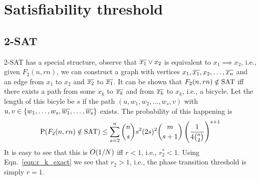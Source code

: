 \documentclass[letterpaper, 10pt, twocolumn, reqno, fleqn]{amsart}
\begin{document}
\section{Satisfiability threshold}
\label{sec:sat_thresh}


\subsection{2-SAT}
\label{ssec:2sat}
2-SAT has a special structure, observe that $\overline{x_1} \vee x_2$ is equivalent to $x_1 \implies x_2$, i.e., given $F_2(n, rn)$, we can construct a graph with
vertices $x_1, \overline{x_1}, x_2, \ldots, \overline{x_n}$ and an edge from $x_1$ to $x_2$ and $\overline{x_2}$ to $\overline{x_1}$. It can be shown that $F_2(n,rn) \notin \textrm{SAT}$ iff
there exists a path from some $x_k$ to $\overline{x_k}$ and from $\overline{x_k}$ to $x_k$, i.e., a bicycle. Let the length of this bicyle be $s$ if the path $(u, w_1, w_2
, \ldots, w_s, v)$ with $u,v \in \{w_1, \ldots, w_s,\overline{w_1}, \ldots, \overline{w_s}\}$
 exists. The probability of this happening is
$$
\textrm{P}(F_2(n,rn) \notin \textrm{SAT}) \leq \sum_{s=2}^n {n \choose s} s^2 (2s)^2 {m \choose s+1} \left(\frac{1}{4 {n \choose 2}}\right)^{s+1}
$$
It is easy to see that this is $O(1/N)$ iff $r <1$, i.e., $r_2^* < 1$. Using Eqn.~\eqref{eqn:r_k_exact} we see that $r_2 > 1$, i.e., the phase transition threshold is simply $r = 1$.


{
\small


}
\end{document}
